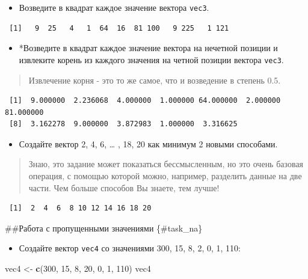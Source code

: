 \documentclass[
]{book}
\newenvironment{Shaded}{\begin{snugshade}}{\end{snugshade}}
\newcommand{\DecValTok}[1]{\textcolor[rgb]{0.00,0.00,0.81}{#1}}
\newcommand{\KeywordTok}[1]{\textcolor[rgb]{0.13,0.29,0.53}{\textbf{#1}}}
\newcommand{\NormalTok}[1]{#1}
\newcommand{\StringTok}[1]{\textcolor[rgb]{0.31,0.60,0.02}{#1}}
\providecommand{\tightlist}{%
  \setlength{\itemsep}{0pt}\setlength{\parskip}{0pt}}
\begin{document}
\begin{itemize}
\tightlist
\item
  Возведите в квадрат каждое значение вектора \texttt{vec3}.
\end{itemize}

\begin{verbatim}
 [1]   9  25   4   1  64  16  81 100   9 225   1 121
\end{verbatim}

\begin{itemize}
\tightlist
\item
  *Возведите в квадрат каждое значение вектора на нечетной позиции и извлеките корень из каждого значения на четной позиции вектора \texttt{vec3}.
\end{itemize}

\begin{quote}
Извлечение корня - это то же самое, что и возведение в степень 0.5.
\end{quote}

\begin{verbatim}
 [1]  9.000000  2.236068  4.000000  1.000000 64.000000  2.000000 81.000000
 [8]  3.162278  9.000000  3.872983  1.000000  3.316625
\end{verbatim}

\begin{itemize}
\tightlist
\item
  Создайте вектор 2, 4, 6, \ldots{} , 18, 20 как минимум 2 новыми способами.
\end{itemize}

\begin{quote}
Знаю, это задание может показаться бессмысленным, но это очень базовая операция, с помощью которой можно, например, разделить данные на две части. Чем больше способов Вы знаете, тем лучше!
\end{quote}

\begin{verbatim}
 [1]  2  4  6  8 10 12 14 16 18 20
\end{verbatim}

\#\#Работа с пропущенными значениями \{\#task\_na\}

\begin{itemize}
\tightlist
\item
  Создайте вектор \texttt{vec4} со значениями 300, 15, 8, 2, 0, 1, 110:
\end{itemize}

\begin{Shaded}
\begin{Highlighting}[]
\NormalTok{vec4 <-}\StringTok{ }\KeywordTok{c}\NormalTok{(}\DecValTok{300}\NormalTok{, }\DecValTok{15}\NormalTok{, }\DecValTok{8}\NormalTok{, }\DecValTok{20}\NormalTok{, }\DecValTok{0}\NormalTok{, }\DecValTok{1}\NormalTok{, }\DecValTok{110}\NormalTok{)}
\NormalTok{vec4}
\end{Highlighting}
\end{Shaded}
\end{document}
